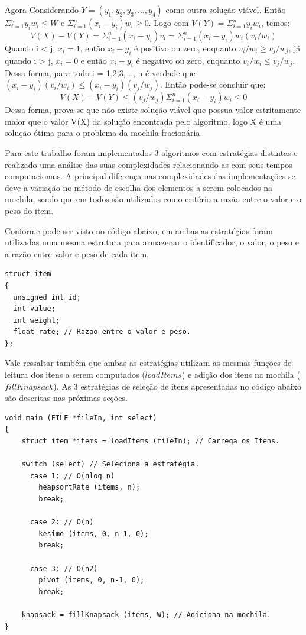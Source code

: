 \documentclass[
	12pt,				%
	oneside,			%
	a4paper,			%
	english,			%
	french,				%
	spanish,			%
	brazil,				%
	]{abntex2}
\begin{document}
Agora Considerando \(Y = (y_1, y_2, y_3, ..., y_4)\) como outra solução viável. Então \( \Sigma_{i=1}^ny_iw_i \leq W\) e \( \Sigma_{i=1}^n(x_i - y_i)w_i \geq 0\). Logo com \( V(Y) = \Sigma_{i=1}^ny_iw_i\), temos:
\[ V(X) - V(Y) = \Sigma_{i=1}^n(x_i - y_i)v_i = \Sigma_{i=1}^n(x_i - y_i)w_i{(v_i/w_i)} \]
Quando i < j, \( x_i = 1 \), então \(x_i - y_i\) é positivo ou zero, enquanto \(v_i/w_i \geq v_j/w_j\), já quando i > j, \( x_i = 0\) e então \(x_i - y_i\) é negativo ou zero, enquanto \(v_i/w_i \leq v_j/w_j\). Dessa forma, para todo i = 1,2,3, .., n é verdade que \((x_i - y_i)(v_i/w_i) \leq (x_i - y_i)(v_j/w_j)\). Então pode-se concluir que: 
\[V(X) - V(Y) \leq (v_j/w_j)\Sigma_{i=1}^n(x_i - y_i)w_i \leq 0\]
Dessa forma, prova-se que não existe solução viável que possua valor estritamente maior que o valor V(X) da solução encontrada pelo algoritmo, logo X é uma solução ótima para o problema da mochila fracionária.

Para este trabalho foram implementados 3 algoritmos com estratégias distintas e realizado uma análise das suas complexidades relacionando-as com seus tempos computacionais. A principal diferença nas complexidades das implementações se deve a variação no método de escolha dos elementos a serem colocados na mochila, sendo que em todos são utilizados como critério a razão entre o valor e o peso do item. 

Conforme pode ser visto no código abaixo, em ambas as estratégias foram utilizadas uma mesma estrutura para armazenar o identificador, o valor, o peso e a razão entre valor e peso de cada item.

\begin{lstlisting}[mathescape=true, label=struct]
struct item
{
  unsigned int id;
  int value;
  int weight;    
  float rate; // Razao entre o valor e peso.  
};
\end{lstlisting}

Vale ressaltar também que ambas as estratégias utilizam as mesmas funções de leitura dos itens a serem computados ($loadItems$) e adição dos itens na mochila ($fillKnapsack$). As 3 estratégias de seleção de itens apresentadas no código abaixo são descritas nas próximas seções.

\begin{lstlisting}[mathescape=true, label=heapsort]
void main (FILE *fileIn, int select)
{
    struct item *items = loadItems (fileIn); // Carrega os Itens.
    
    switch (select) // Seleciona a estratégia.
      case 1: // O(nlog n)        
        heapsortRate (items, n);
        break;
    
      case 2: // O(n)
        kesimo (items, 0, n-1, 0);
        break;
    
      case 3: // O(n2)
        pivot (items, 0, n-1, 0);
        break;
    
    knapsack = fillKnapsack (items, W); // Adiciona na mochila.
}
\end{lstlisting}
\end{document}
